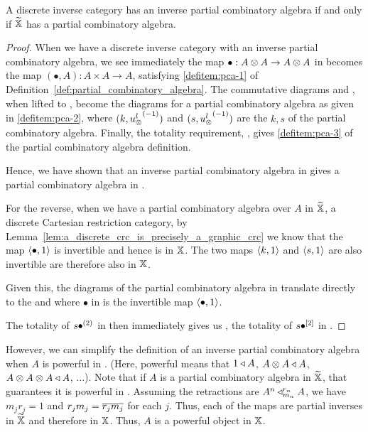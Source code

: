 \begin{proposition}\label{prop:inverse-pca-iff-pca}
  A discrete inverse category \X has an inverse partial combinatory algebra if and only if $\widetilde{\mathbb{X}}$ has
  a partial combinatory algebra.
\end{proposition}
\begin{proof}
  When we have a discrete inverse category \X with an inverse partial combinatory algebra, we see
  immediately the map $\bullet:A\otimes A\to A\otimes A$ in \X becomes the map $(\bullet,A):A\times A \to A$,
  satisfying \ref{defitem:pca-1} of Definition~\ref{def:partial_combinatory_algebra}. The
  commutative diagrams  and , when lifted to \Xt, become the diagrams
  for a partial combinatory algebra as given in \ref{defitem:pca-2}, where $(k,{u_{\otimes}^l}^{(-1)})$ and
  $(s,{u_{\otimes}^l}^{(-1)})$ are the $k,s$ of the partial combinatory algebra. Finally, the totality
  requirement, , gives \ref{defitem:pca-3} of the partial combinatory algebra
  definition.

  Hence, we have shown that an inverse partial combinatory algebra in \X gives a partial combinatory
  algebra in \Xt.

  For the reverse, when we have a partial combinatory algebra over $A$ in $\widetilde{\mathbb{X}}$, a discrete Cartesian
  restriction category, by Lemma~\ref{lem:a_discrete_crc_is_precisely_a_graphic_crc} we know that
  the map $\langle\bullet,1\rangle$ is invertible and hence is in $\mathbb{X}$. The two maps $\langle k,1\rangle$ and $\langle s,1\rangle$
  are also invertible are therefore also in $\mathbb{X}$.


  Given this, the diagrams of the partial combinatory algebra in \Xt translate directly to the
   and  where $\bullet$ in \X is the invertible map $\langle\bullet,1\rangle$.

  The totality  of $s {\bullet}^{(2)}$ in \Xt then immediately gives us , the
  totality of $s {\bullet}^{[2]}$ in \X.


\end{proof}

However, we can simplify the definition of an inverse partial combinatory algebra when $A$ is
powerful in \X. (Here, powerful means that $1\triangleleft A$, $A\otimes A\triangleleft A$, $A\otimes A\otimes A\triangleleft A$,
$\ldots$). Note that if $A$ is a partial combinatory algebra in $\widetilde{\mathbb{X}}$, that guarantees it is
powerful in \Xt. Assuming the retractions are $A^n \triangleleft_{m_n}^{r_n} A$, we have $m_j r_j =
1$ and $r_j m_j = \overline{r_j m_j}$ for each $j$. Thus, each of the maps are partial inverses in
$\widetilde{\mathbb{X}}$ and therefore in $\mathbb{X}$. Thus, $A$ is a powerful object in $\mathbb{X}$.


